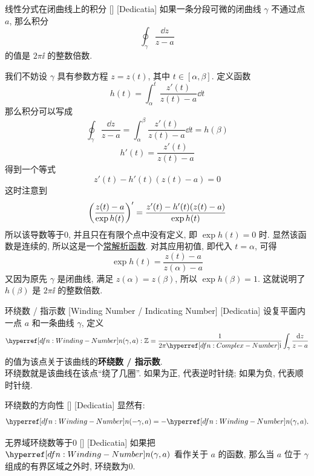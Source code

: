        \begin{thm}
            {线性分式在闭曲线上的积分}
            []
            [Dedicatia]
            如果一条分段可微的闭曲线 \(\gamma\) 不通过点 \(a\), 那么积分
            \[\oint_\gamma\frac{\dd{z}}{z-a} \]
            的值是 \(2\pi\ii\) 的整数倍数. 
        \end{thm}

        \begin{prf}
            我们不妨设 \(\gamma\) 具有参数方程 \(z=z(t)\), 其中 \(t\in[\alpha,\beta]\). 定义函数
            \[h(t)=\int_\alpha^t \frac{z'(t)}{z(t)-a}\dd{t}\]
            那么积分可以写成
            \[\oint_\gamma\frac{\dd{z}}{z-a}=\int_\alpha^\beta \frac{z'(t)}{z(t)-a}\dd{t}=h(\beta)\]
            \[h'(t)=\frac{z'(t)}{z(t)-a}\]
            得到一个等式
            \[z'(t)-h'(t)(z(t)-a)=0\]
            这时注意到
            \[\pqty{\frac{z(t)-a}{\exp h(t)}}'=\frac{z'(t)-h'(t)(z(t)-a)}{\exp h(t)}\]
            所以该导数等于0, 并且只在有限个点中没有定义, 即 \(\exp h(t)=0\) 时. 显然该函数是连续的, 所以这是一个\hyperref[ppt:Trivial-Analytical-Function]{常解析函数}. 对其应用初值, 即代入 \(t=\alpha\), 可得
            \[\exp h(t)=\frac{z(t)-a}{z(\alpha)-a}\]
            又因为原先 \(\gamma\) 是闭曲线, 满足 \(z(\alpha)=z(\beta)\), 所以 \(\exp h(\beta)=1\). 这就说明了 \(h(\beta)\) 是 \(2\pi\ii\) 的整数倍数. 
        \end{prf}

        \begin{dfn}
            {环绕数 / 指示数}
            [Winding Number / Indicating Number]
            [Dedicatia]
            设复平面内一点 \(a\) 和一条曲线 \(\gamma\), 定义
            \[\Windn(\gamma, a):\Z=\frac{1}{2\pi\ii}\int_\gamma\frac{\dd{z}}{z-a}\]
            的值为该点关于该曲线的\textbf{环绕数 / 指示数}.\\
            环绕数就是该曲线在该点“绕了几圈”. 如果为正, 代表逆时针绕; 如果为负, 代表顺时针绕. 
        \end{dfn}

        \begin{ppt}
            {环绕数的方向性}
            []
            [Dedicatia]
            显然有: 
            \[\Windn(-\gamma,a)=-\Windn(\gamma,a).\]
        \end{ppt}

        \begin{ppt}
            {无界域环绕数等于0}
            []
            [Dedicatia]
            如果把 \(\Windn(\gamma,a)\) 看作关于 \(a\) 的函数, 那么当 \(a\) 位于 \(\gamma\) 组成的有界区域之外时, 环绕数为0.
        \end{ppt}

